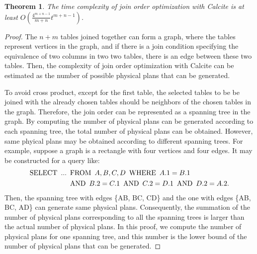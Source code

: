 \documentclass[sigconf, nonacm]{acmart}
\newtheorem{theorem}{Theorem}
\begin{document}
\begin{theorem}
    \label{theorem:complexity-of-calcite}
    The time complexity of join order optimization with Calcite is at least $O(\frac{4^{m+n-1}}{m+n}t^{m+n-1})$.
\end{theorem}
\begin{proof}
    The $n + m$ tables joined together can form a graph, where the tables represent vertices in the graph, and if there is a join condition specifying the equivalence of two columns in two two tables, there is an edge between these two tables.
    Then, the complexity of join order optimization with Calcite can be estimated as the number of possible physical plans that can be generated.
    
    To avoid cross product, except for the first table, the selected tables to be be joined with the already chosen tables should be neighbors of the chosen tables in the graph.
    Therefore, the join order can be represented as a spanning tree in the graph.
    By computing the number of physical plans can be generated according to each spanning tree, the total number of physical plans can be obtained.
    However, same phyical plans may be obtained according to different spanning trees.
    For example, suppose a graph is a rectangle with four vertices and four edges.
    It may be constructed for a query like:
    \begin{equation*}
        \begin{split}
            \text{SELECT}\hspace{.5em} ... & \hspace{.5em}\text{FROM}\hspace{.5em} A, B, C, D \hspace{.5em}\text{WHERE}\hspace{.5em} A.1 = B.1 \\ 
            & \hspace{.5em}\text{AND}\hspace{.5em} B.2 = C.1 \hspace{.5em}\text{AND}\hspace{.5em} C.2 = D.1 \hspace{.5em}\text{AND}\hspace{.5em} D.2 = A.2. 
        \end{split}
    \end{equation*}
    Then, the spanning tree with edges \{AB, BC, CD\} and the one with edges \{AB, BC, AD\} can generate same physical plans.
    Consequently, the summation of the number of physical plans corresponding to all the spanning trees is larger than the actual number of physical plans.
    In this proof, we compute the number of physical plans for one spanning tree, and this number is the lower bound of the number of physical plans that can be generated.


\end{proof}
\end{document}
